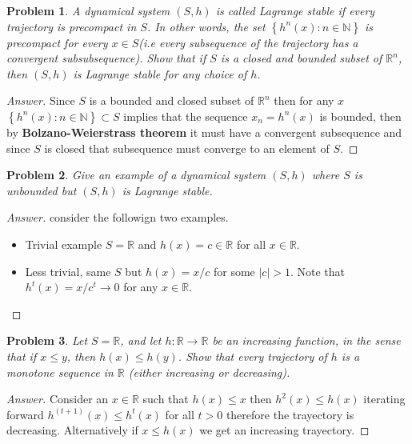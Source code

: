 \documentclass{article}
\newtheorem{problem}{Problem}[section]
\begin{document}
\begin{problem}
    A dynamical system $(S, h)$ is called Lagrange stable if every trajectory is precompact in $S$. In other words, the set $\left\{h^{n}(x): n \in \mathbb{N}\right\}$ is precompact for every $x \in S $(i.e every subsequence of the trajectory has a convergent subsubsequence). Show that if $S$ is a closed and bounded subset of $\mathbb{R}^{n}$, then $(S, h)$ is Lagrange stable for any choice of $h$.
\end{problem}

\begin{proof}[Answer]
    Since $S$ is a bounded and closed subset of $\mathbb{R}^n$ then for any $x$ $\left\{h^{n}(x): n \in \mathbb{N}\right\}\subset S$ implies that the sequence $x_n = h^n(x)$ is bounded, then by \textbf{Bolzano-Weierstrass theorem} it must have a convergent subsequence and since $S$ is closed that subsequence must converge to an element of $S$.
\end{proof}

\begin{problem}
    Give an example of a dynamical system $(S, h)$ where $S$ is unbounded but $(S, h)$ is Lagrange stable.
\end{problem}

\begin{proof}[Answer] consider the followign two examples.
    \begin{itemize}
        \item Trivial example $S = \mathbb{R}$ and $h(x) = c\in \mathbb{R}$ for all $x\in \mathbb{R}$.
        \item Less trivial, same $S$ but $h(x) = x/c$ for some $|c|>1$. Note that $h^t(x) = x/c^t \to 0$ for any $x\in \mathbb{R}$. 
    \end{itemize}

\end{proof}

\begin{problem}
    Let $S=\mathbb{R}$, and let $h: \mathbb{R} \rightarrow \mathbb{R}$ be an increasing function, in the sense that if $x \leq y$, then $h(x) \leq h(y)$. Show that every trajectory of $h$ is a monotone sequence in $\mathbb{R}$ (either increasing or decreasing).
\end{problem}

\begin{proof}[Answer]
    Consider an $x\in \mathbb{R}$ such that $h(x)\leq x$ then $h^2(x) \leq h(x)$ iterating forward $h^(t+1)(x) \leq h^t(x)$ for all $t>0$ therefore the trayectory is decreasing. Alternatively if $x\leq h(x)$ we get an increasing trayectory.
\end{proof}
\end{document}
